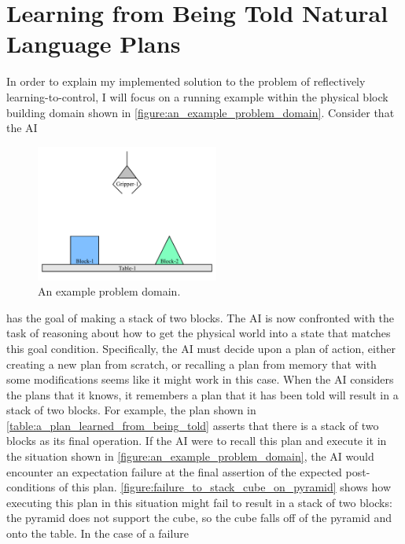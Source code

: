 \chapter{Learning from Being Told Natural Language Plans}
\label{chapter:learning_from_being_told_natural_language_plans}

In order to explain my implemented solution to the problem of
reflectively learning-to-control, I will focus on a running example
within the physical block building domain shown in
\autoref{figure:an_example_problem_domain}.  Consider that the AI 
\begin{figure}
  \includegraphics[width=6cm]{gfx/blocks_world_example-1}
  \caption[An example problem domain.]{An example problem domain.}
  \label{figure:an_example_problem_domain}
\end{figure}
has the goal of making a stack of two blocks.  The AI is now
confronted with the task of reasoning about how to get the physical
world into a state that matches this goal condition.  Specifically,
the AI must decide upon a plan of action, either creating a new plan
from scratch, or recalling a plan from memory that with some
modifications seems like it might work in this case.  When the AI
considers the plans that it knows, it remembers a plan that it has
been told will result in a stack of two blocks.  For example, the plan
shown in {\mbox{\autoref{table:a_plan_learned_from_being_told}}}
asserts that there is a stack of two blocks as its final operation.
If the AI were to recall this plan and execute it in the situation
shown in \autoref{figure:an_example_problem_domain}, the AI would
encounter an expectation failure at the final assertion of the
expected post-conditions of this plan.
{\mbox{\autoref{figure:failure_to_stack_cube_on_pyramid}}} shows how
executing this plan in this situation might fail to result in a stack
of two blocks: the pyramid does not support the cube, so the cube
falls off of the pyramid and onto the table.  In the case of a failure

